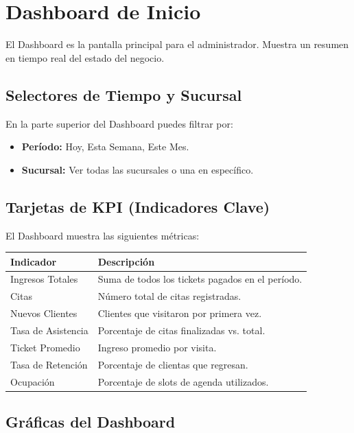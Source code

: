 \documentclass[12pt,a4paper]{article}
\begin{document}
\newpage
\section{Dashboard de Inicio}

El Dashboard es la pantalla principal para el administrador. Muestra un resumen en tiempo real del estado del negocio.

\subsection{Selectores de Tiempo y Sucursal}

En la parte superior del Dashboard puedes filtrar por:
\begin{itemize}[leftmargin=*]
  \item \textbf{Período:} Hoy, Esta Semana, Este Mes.
  \item \textbf{Sucursal:} Ver todas las sucursales o una en específico.
\end{itemize}

\subsection{Tarjetas de KPI (Indicadores Clave)}

El Dashboard muestra las siguientes métricas:

\begin{center}
\begin{tabular}{@{}lp{8cm}@{}}
\toprule
\textbf{Indicador} & \textbf{Descripción} \\
\midrule
Ingresos Totales & Suma de todos los tickets pagados en el período. \\
Citas & Número total de citas registradas. \\
Nuevos Clientes & Clientes que visitaron por primera vez. \\
Tasa de Asistencia & Porcentaje de citas finalizadas vs. total. \\
Ticket Promedio & Ingreso promedio por visita. \\
Tasa de Retención & Porcentaje de clientas que regresan. \\
Ocupación & Porcentaje de slots de agenda utilizados. \\
\bottomrule
\end{tabular}
\end{center}

\subsection{Gráficas del Dashboard}
\end{document}
